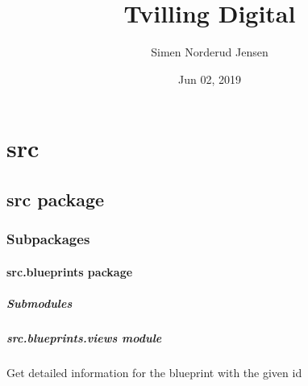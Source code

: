 \documentclass[letterpaper,10pt,english]{sphinxmanual}
\title{Tvilling Digital}
\date{Jun 02, 2019}
\author{Simen Norderud Jensen}
\begin{document}
\pagestyle{empty}
\sphinxmaketitle
\pagestyle{plain}
\sphinxtableofcontents
\pagestyle{normal}
\label{\detokenize{index::doc}}



\chapter{src}
\label{\detokenize{modules:src}}\label{\detokenize{modules::doc}}

\section{src package}
\label{\detokenize{src:src-package}}\label{\detokenize{src::doc}}

\subsection{Subpackages}
\label{\detokenize{src:subpackages}}

\subsubsection{src.blueprints package}
\label{\detokenize{src.blueprints:src-blueprints-package}}\label{\detokenize{src.blueprints::doc}}

\paragraph{Submodules}
\label{\detokenize{src.blueprints:submodules}}

\paragraph{src.blueprints.views module}
\label{\detokenize{src.blueprints:module-src.blueprints.views}}\label{\detokenize{src.blueprints:src-blueprints-views-module}}

\begin{fulllineitems}
\label{\detokenize{src.blueprints:src.blueprints.views.blueprint_detail}}
Get detailed information for the blueprint with the given id

\end{fulllineitems}
\end{document}
